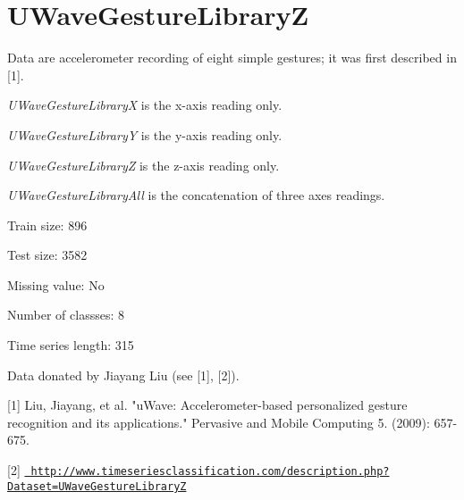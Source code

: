 \chapter{UWave\+Gesture\+LibraryZ}
\hypertarget{md_external_2data_2UCRArchive__2018_2UWaveGestureLibraryZ_2README}{}\label{md_external_2data_2UCRArchive__2018_2UWaveGestureLibraryZ_2README}
\label{md_external_2data_2UCRArchive__2018_2UWaveGestureLibraryZ_2README_autotoc_md228}%
%
 Data are accelerometer recording of eight simple gestures; it was first described in \mbox{[}1\mbox{]}.

{\itshape UWave\+Gesture\+LibraryX} is the x-\/axis reading only.

{\itshape UWave\+Gesture\+LibraryY} is the y-\/axis reading only.

{\itshape UWave\+Gesture\+LibraryZ} is the z-\/axis reading only.

{\itshape UWave\+Gesture\+Library\+All} is the concatenation of three axes readings.

Train size\+: 896

Test size\+: 3582

Missing value\+: No

Number of classses\+: 8

Time series length\+: 315

Data donated by Jiayang Liu (see \mbox{[}1\mbox{]}, \mbox{[}2\mbox{]}).

\mbox{[}1\mbox{]} Liu, Jiayang, et al. "{}u\+Wave\+: Accelerometer-\/based personalized gesture recognition and its applications."{} Pervasive and Mobile Computing 5. (2009)\+: 657-\/675.

\mbox{[}2\mbox{]} \href{http://www.timeseriesclassification.com/description.php?Dataset=UWaveGestureLibraryZ}{\texttt{ http\+://www.\+timeseriesclassification.\+com/description.\+php?\+Dataset=\+UWave\+Gesture\+LibraryZ}} 